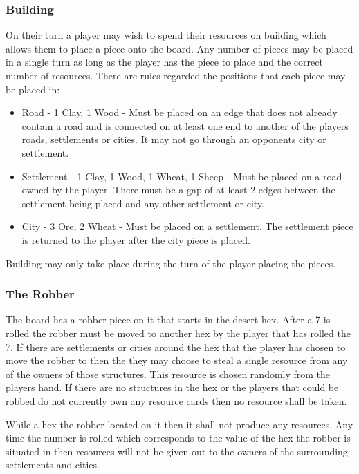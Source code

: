 \documentclass[]{article}
\begin{document}
\subsubsection{Building}
On their turn a player may wish to spend their resources on building which allows them to place a piece onto the board. Any number of pieces may be placed in a single turn as long as the player has the piece to place and the correct number of resources. There are rules regarded the positions that each piece may be placed in:

\begin{itemize}
  \item Road - 1 Clay, 1 Wood - Must be placed on an edge that does not already contain a road and is connected on at least one end to another of the players roads, settlements or cities. It may not go through an opponents city or settlement.
  \item Settlement - 1 Clay, 1 Wood, 1 Wheat, 1 Sheep - Must be placed on a road owned by the player. There must be a gap of at least 2 edges between the settlement being placed and any other settlement or city.
  \item City - 3 Ore, 2 Wheat - Must be placed on a settlement. The settlement piece is returned to the player after the city piece is placed.
\end{itemize}

\par Building may only take place during the turn of the player placing the pieces.

\subsubsection{The Robber}
The board has a robber piece on it that starts in the desert hex. After a 7 is rolled the robber must be moved to another hex by the player that has rolled the 7. If there are settlements or cities around the hex that the player has chosen to move the robber to then the they may choose to steal a single resource from any of the owners of those structures. This resource is chosen randomly from the players hand. If there are no structures in the hex or the players that could be robbed do not currently own any resource cards then no resource shall be taken.

\par While a hex the robber located on it then it shall not produce any resources. Any time the number is rolled which corresponds to the value of the hex the robber is situated in then resources will not be given out to the owners of the surrounding settlements and cities.
\end{document}
